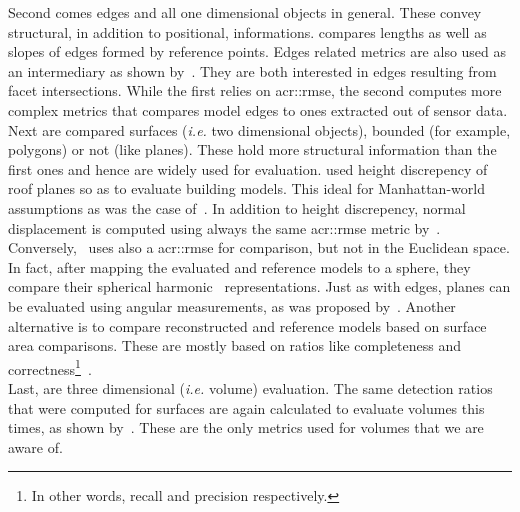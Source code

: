             Second comes edges and all one dimensional objects in general.
            These convey structural, in addition to positional, informations.
            \textcite{kaartinen2005accuracy} compares lengths as well as slopes of edges formed by reference points.
            Edges related metrics are also used as an intermediary as shown by~\textcite{elberink2011quality,michelin2013quality}.
            They are both interested in edges resulting from facet intersections.
            While the first relies on \gls{acr::rmse}, the second computes more complex metrics that compares model edges to ones extracted out of sensor data.\\

            Next are compared surfaces (\textit{i.e.} two dimensional objects), bounded (for example, polygons) or not (like planes).
            These hold more structural information than the first ones and hence are widely used for evaluation.
            \textcite{rottensteiner2014results} used height discrepency of roof planes so as to evaluate building models.
            This ideal for Manhattan-world assumptions as was the case of~\textcite{zebedin2008fusion}.
            In addition to height discrepency, normal displacement is computed using always the same \gls{acr::rmse} metric by~\textcite{henricsson19973}.
            Conversely,~\textcite{zeng2014multicriteria} uses also a \gls{acr::rmse} for comparison, but not in the Euclidean space.
            In fact, after mapping the evaluated and reference models to a sphere, they compare their spherical harmonic~\parencite{brechbuhler1995parametrization} representations.
            Just as with edges, planes can be evaluated using angular measurements, as was proposed by~\textcite{henricsson19973,landes2012quality}.
            Another alternative is to compare reconstructed and reference models based on surface area comparisons.
            These are mostly based on ratios like completeness and correctness\footnote{In other words, recall and precision respectively.}~\parencite{henricsson19973,schuster2003new,landes2012quality,rottensteiner2014results}.\\

            Last, are three dimensional (\textit{i.e.} volume) evaluation.
            The same detection ratios that were computed for surfaces are again calculated to evaluate volumes this times, as shown by~\textcite{jaynes2003recognition,mohamed2013quality, zeng2014multicriteria,nguatem2017modeling}.
            These are the only metrics used for volumes that we are aware of.\\

